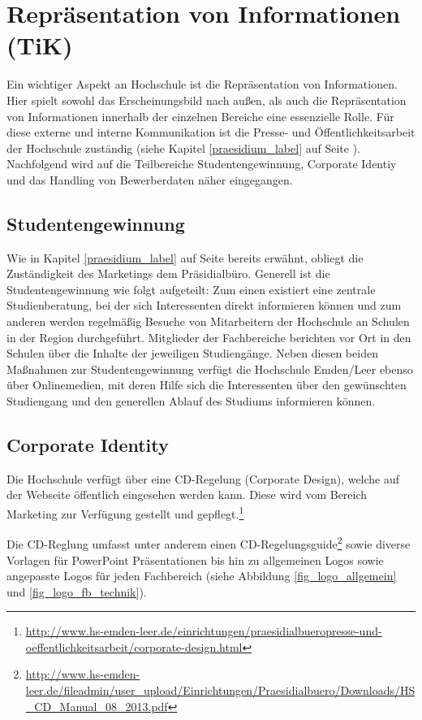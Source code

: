 \section{Repräsentation von Informationen (TiK)}
Ein wichtiger Aspekt an Hochschule ist die Repräsentation von Informationen. Hier spielt sowohl das Erscheinungsbild nach außen, als auch die Repräsentation von Informationen innerhalb der einzelnen Bereiche eine essenzielle Rolle. Für diese externe und interne Kommunikation ist die Presse- und Öffentlichkeitsarbeit der Hochschule zuständig (siehe Kapitel \ref{praesidium_label} auf Seite \pageref{praesidium_label}). Nachfolgend wird auf die Teilbereiche   Studentengewinnung, Corporate Identiy und das Handling von Bewerberdaten näher eingegangen.

\subsection{Studentengewinnung}
Wie in Kapitel \ref{praesidium_label} auf Seite \pageref{praesidium_label} bereits erwähnt, obliegt die Zuständigkeit des Marketings dem Präsidialbüro. Generell ist die Studentengewinnung wie folgt aufgeteilt: Zum einen existiert eine zentrale Studienberatung, bei der sich Interessenten direkt informieren können und zum anderen werden regelmäßig Besuche von Mitarbeitern der Hochschule an Schulen in der Region durchgeführt. Mitglieder der Fachbereiche berichten vor Ort in den Schulen über die Inhalte der jeweiligen Studiengänge. Neben diesen beiden Maßnahmen zur Studentengewinnung verfügt die Hochschule Emden/Leer ebenso über Onlinemedien, mit deren Hilfe sich die Interessenten über den gewünschten Studiengang und den generellen Ablauf des  Studiums informieren können. 


\subsection{Corporate Identity}
Die Hochschule verfügt über eine CD-Regelung (Corporate Design), welche auf der Webseite öffentlich eingesehen werden kann. Diese wird vom Bereich Marketing zur Verfügung gestellt und gepflegt.\footnote{\url{http://www.hs-emden-leer.de/einrichtungen/praesidialbueropresse-und-oeffentlichkeitsarbeit/corporate-design.html}}

Die CD-Reglung umfasst unter anderem einen CD-Regelungsguide\footnote{\url{http://www.hs-emden-leer.de/fileadmin/user_upload/Einrichtungen/Praesidialbuero/Downloads/HS_CD_Manual_08_2013.pdf}} sowie diverse Vorlagen für PowerPoint Präsentationen bis hin zu allgemeinen Logos sowie angepasste Logos für jeden Fachbereich (siehe Abbildung \ref{fig_logo_allgemein} und \ref{fig_logo_fb_technik}).

